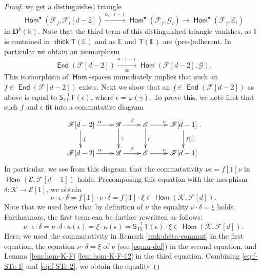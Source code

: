 \documentclass[a4paper,11pt, reqno]{amsart}
\def\E{\mathbb E}
\def\F{\mathbb F}
\def\DD{\mathbf D}
\def\sE{\mathscr{E}}
\def\sF{\mathscr{F}}
\def\sG{\mathscr{G}}
\def\sK{\mathscr{K}}
\newcommand{\opname}[1]{\operatorname{\mathsf{#1}}}
\newcommand{\Hom}{\opname{Hom}}
\newcommand{\End}{\opname{End}}
\newcommand{\thick}{\opname{thick}\nolimits}
\def\Db{\DD^b}
\newcommand{\bS}{\mathsf{S}}
\newcommand{\bT}{\mathsf{T}}
\theoremstyle{plain}
\theoremstyle{definition}
\numberwithin{equation}{section}
\newlength{\arrow}
\begin{document}
\begin{proof}
we get a distinguished triangle 
\[
\Hom^\bullet ( \sF_j , \sF_i [d-2] ) \xrightarrow{\alpha_i \cdot (-)} \Hom^\bullet ( \sF_j  , \sG_i ) \to \Hom^\bullet ( \sF_j , \sE_i )
\]
in $\Db(\mathbb{k})$.
Note that the third term of this distinguished triangle vanishes, as $\F$ is contained in $\thick \bT ( \E )$ and as $\E$ and $\bT ( \E )$ are (pre-)adherent.
In particular we obtain an isomorphism 
\begin{equation}\label{eq:f_1}
\End( \sF [d-2] )  \xrightarrow[\cong]{\alpha \cdot (-) }  \Hom( \sF [d-2] , \sG ).
\end{equation}
This isomorphism of $\Hom$-spaces immediately implies that such an $f \in \End ( \sF [d-2] )$ exists.
Next we show that an $f \in \End( \sF[d-2] )$ as above is equal to $\bS^{-1}_{\bT\E}\bT (\epsilon ) $, where $\epsilon = \varphi (  \gamma )$. 
To prove this, we note first that such $f$ and $\epsilon$ fit into a commutative diagram
\begin{equation*}\label{eq:E-G-F}
\xymatrix{
    \sF [d-2]  \ar@{->}[d]^{f} \ar@{->}[r]^{\alpha} &  \sG \ar@{->}[d]^{\gamma} \ar@{->}[r]^{\beta} & \sE \ar@{->}[d]^{\epsilon} \ar@{->}[r]^{\nu} & \sF [d-1] \ar@{->}[d]^{f[1]} \\
 \sF [d-2] \ar@{->}[r]^{\alpha} &  \sG \ar@{->}[r]^{\beta} & \sE \ar@{->}[r]^{\nu} & \sF [d-1] }.
\end{equation*}
In particular, we see from this diagram that the commutativity $\nu \epsilon = f [1] \nu$ in $\Hom ( \sE , \sF [d-1] )$ holds.
Precomposing this equation with the morphism $\delta \colon \sK \to \sE [1]$, we obtain
\begin{equation}\label{eq:f-STe-1}
    \nu \cdot \epsilon \cdot \delta = f [1] \cdot \nu \cdot \delta = f[1] \cdot \xi \in \Hom ( \sK , \sF [d]) .
\end{equation}
Note that we used here that by definition of $\nu$ the equality $\nu\cdot \delta = \xi$ holds.
Furthermore, the first term can be further rewritten as follows:
\begin{equation}\label{eq:f-STe-2}
\nu \cdot \epsilon \cdot \delta = \nu \cdot \delta \cdot \kappa (\epsilon ) = \xi \cdot \kappa ( \epsilon ) = \bS^{-1}_{\bT\E} \bT ( \epsilon ) \cdot \xi  \in \Hom (\sK , \sF [d] ) .
\end{equation}
Here, we used the commutativity in Remark \ref{rmk:delta-commut} in the first equation, the equation $\nu\cdot \delta = \xi$ of $\nu$ (see \eqref{eq:nu-def}) in the second equation, and Lemma \ref{lem:hom-K-F} \eqref{lem:hom-K-F-12} in the third equation.
Combining \eqref{eq:f-STe-1} and \eqref{eq:f-STe-2}, we obtain the equality

\end{proof}
\end{document}
